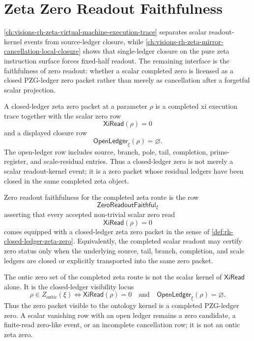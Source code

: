 \chapter{Zeta Zero Readout Faithfulness}
\label{ch:visions-rh-zeta-zero-readout-faithfulness}

\autoref{ch:visions-rh-zeta-virtual-machine-execution-trace} separates
scalar readout-kernel events from source-ledger closure, while
\autoref{ch:visions-rh-zeta-mirror-cancellation-local-closure} shows that
single-ledger closure on the pure zeta instruction surface forces
fixed-half readout.  The remaining interface is the faithfulness of zero
readout: whether a scalar completed zero is licensed as a closed
PZG-ledger zero packet rather than merely as cancellation after a
forgetful scalar projection.

\begin{definition}
\label{def:rh-closed-ledger-zeta-zero}
A closed-ledger zeta zero packet at a parameter $\rho$ is a completed xi
execution trace together with the scalar zero row
$$
\mathsf{XiRead}(\rho)=0
$$
and a displayed closure row
$$
\mathsf{OpenLedger}_{\xi}(\rho)=\varnothing.
$$
The open-ledger row includes source, branch, pole, tail, completion,
prime-register, and scale-residual entries.  Thus a closed-ledger zero is
not merely a scalar readout-kernel event; it is a zero packet whose
residual ledgers have been closed in the same completed zeta object.
\end{definition}

\begin{definition}
\label{def:rh-zero-readout-faithfulness}
Zero readout faithfulness for the completed zeta route is the row
$$
\mathsf{ZeroReadoutFaithful}_{\xi}
$$
asserting that every accepted non-trivial scalar zero read
$$
\mathsf{XiRead}(\rho)=0
$$
comes equipped with a closed-ledger zeta zero packet in the sense of
\autoref{def:rh-closed-ledger-zeta-zero}.  Equivalently, the completed
scalar readout may certify zero status only when the underlying source,
tail, branch, completion, and scale ledgers are closed or explicitly
transported into the same zero packet.
\end{definition}

\begin{principle}
\label{prin:rh-zero-visibility}
The ontic zero set of the completed zeta route is not the scalar kernel
of $\mathsf{XiRead}$ alone.  It is the closed-ledger visibility locus
$$
\rho\in Z_{\mathrm{ontic}}(\xi)
\Longleftrightarrow
\mathsf{XiRead}(\rho)=0
\quad\text{and}\quad
\mathsf{OpenLedger}_{\xi}(\rho)=\varnothing.
$$
Thus the zero packet visible to the ontology kernel is a completed
PZG-ledger zero.  A scalar vanishing row with an open ledger remains a
zero candidate, a finite-read zero-like event, or an incomplete
cancellation row; it is not an ontic zeta zero.
\end{principle}

